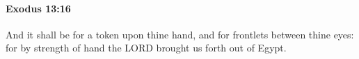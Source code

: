
		\paragraph{Exodus 13:16} %
			\label{EXODUS-13-16}

			And it shall be for a token upon thine hand, and for frontlets between thine eyes: for by strength of hand the LORD brought us forth out of Egypt.


